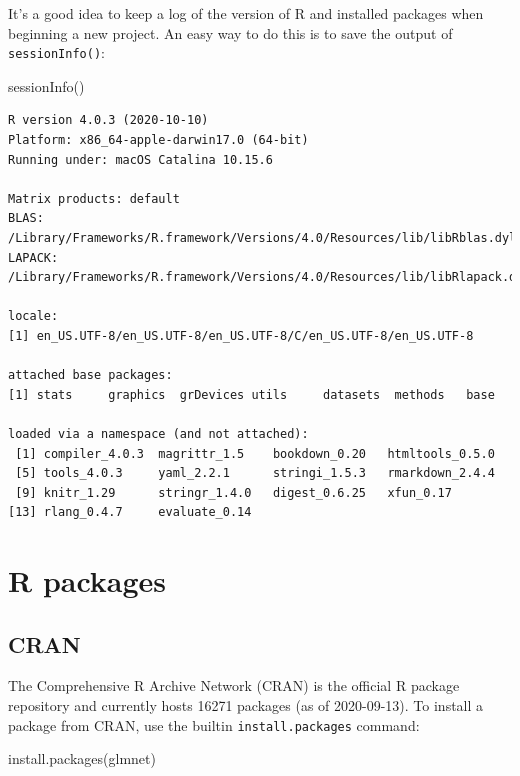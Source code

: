 \documentclass[
]{book}
\newenvironment{Shaded}{\begin{snugshade}}{\end{snugshade}}
\newcommand{\FunctionTok}[1]{\textcolor[rgb]{0.00,0.00,0.00}{#1}}
\newcommand{\NormalTok}[1]{#1}
\newcommand{\StringTok}[1]{\textcolor[rgb]{0.31,0.60,0.02}{#1}}
\begin{document}
It's a good idea to keep a log of the version of R and installed packages when beginning a new project. An easy way to do this is to save the output of \texttt{sessionInfo()}:

\begin{Shaded}
\begin{Highlighting}[]
\FunctionTok{sessionInfo}\NormalTok{()}
\end{Highlighting}
\end{Shaded}

\begin{verbatim}
R version 4.0.3 (2020-10-10)
Platform: x86_64-apple-darwin17.0 (64-bit)
Running under: macOS Catalina 10.15.6

Matrix products: default
BLAS:   /Library/Frameworks/R.framework/Versions/4.0/Resources/lib/libRblas.dylib
LAPACK: /Library/Frameworks/R.framework/Versions/4.0/Resources/lib/libRlapack.dylib

locale:
[1] en_US.UTF-8/en_US.UTF-8/en_US.UTF-8/C/en_US.UTF-8/en_US.UTF-8

attached base packages:
[1] stats     graphics  grDevices utils     datasets  methods   base     

loaded via a namespace (and not attached):
 [1] compiler_4.0.3  magrittr_1.5    bookdown_0.20   htmltools_0.5.0
 [5] tools_4.0.3     yaml_2.2.1      stringi_1.5.3   rmarkdown_2.4.4
 [9] knitr_1.29      stringr_1.4.0   digest_0.6.25   xfun_0.17      
[13] rlang_0.4.7     evaluate_0.14  
\end{verbatim}

\hypertarget{r-packages}{%
\section{R packages}\label{r-packages}}

\hypertarget{cran}{%
\subsection{CRAN}\label{cran}}

The Comprehensive R Archive Network (CRAN) is the official R package repository and currently hosts 16271 packages (as of 2020-09-13). To install a package from CRAN, use the builtin \texttt{install.packages} command:

\begin{Shaded}
\begin{Highlighting}[]
\FunctionTok{install.packages}\NormalTok{(}\StringTok{\textquotesingle{}glmnet\textquotesingle{}}\NormalTok{)}
\end{Highlighting}
\end{Shaded}
\end{document}

